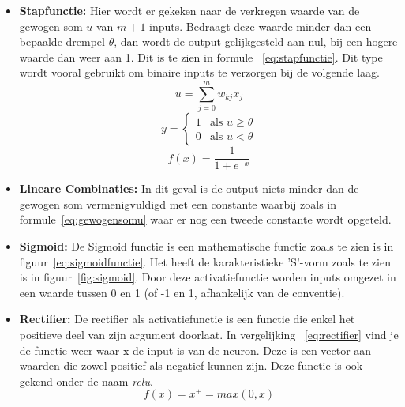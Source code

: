 			\begin{itemize}
				\item \textbf{Stapfunctie:} Hier wordt er gekeken naar de verkregen waarde van de gewogen som $u$ van $m+1$ inputs. Bedraagt deze waarde minder dan een bepaalde drempel $\theta$, dan wordt de output gelijkgesteld aan nul, bij een hogere waarde dan weer aan 1. Dit is te zien in formule ~\ref{eq:stapfunctie}. Dit type wordt vooral gebruikt om binaire inputs te verzorgen bij de volgende laag. 
				\begin{equation}\label{eq:gewogensomu}
					u =  \sum_{j=0}^{m}w_{kj}x_j
				\end{equation}
				\begin{equation}\label{eq:stapfunctie}
					y={\begin{cases}1&{\text{als }}u\geq \theta
					\\0&{\text{als }}u<\theta \end{cases}}
				\end{equation}
				\begin{equation}\label{eq:sigmoidfunctie}
					f(x)={\frac {1}{1+e^{-x}}}
				\end{equation}
				\item \textbf{Lineare Combinaties:} In dit geval is de output niets minder dan de gewogen som vermenigvuldigd met een constante waarbij zoals in formule~\ref{eq:gewogensomu} waar er nog een tweede constante wordt opgeteld.
				\item \textbf{Sigmoid:} De Sigmoid functie\cite{han1995influence} is een mathematische functie zoals te zien is in figuur~\ref{eq:sigmoidfunctie}. Het heeft de karakteristieke 'S'-vorm zoals te zien is in figuur~\ref{fig:sigmoid}. Door deze activatiefunctie worden inputs omgezet in een waarde tussen 0 en 1 (of -1 en 1, afhankelijk van de conventie).
				\item \textbf{Rectifier:} De rectifier als activatiefunctie\cite{nair2010rectified} is een functie die enkel het positieve deel van zijn argument doorlaat. In vergelijking ~\ref{eq:rectifier} vind je de functie weer waar x de input is van de neuron. Deze is een vector aan waarden die zowel positief als negatief kunnen zijn. Deze functie is ook gekend onder de naam \textit{\gls{relu}}.
				\begin{equation}\label{eq:rectifier}
				f(x) = x^+ = max(0,x)
				\end{equation}
			\end{itemize}
			
			 
			
